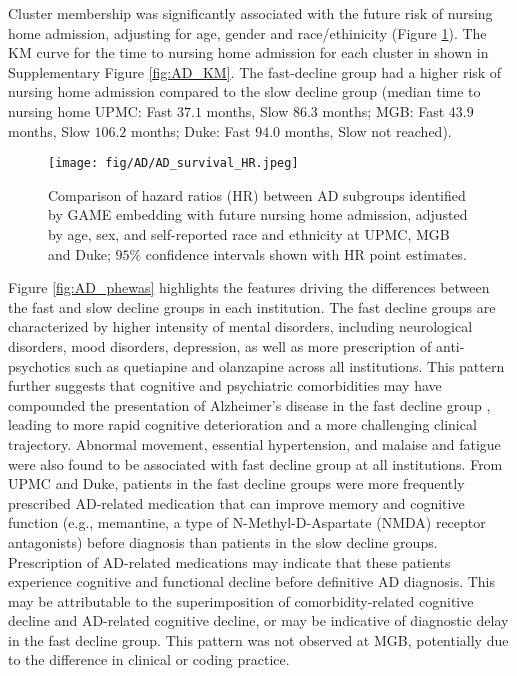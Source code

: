 \documentclass{article}
\begin{document}
Cluster membership was significantly associated with the future risk of nursing home admission, adjusting for age, gender and race/ethinicity (Figure \ref{fig:AD_HR}). The KM curve for the time to nursing home admission for each cluster in shown in Supplementary Figure \ref{fig:AD_KM}. The fast-decline group had a higher risk of nursing home admission compared to the slow decline group (median time to nursing home UPMC: Fast $37.1$ months, Slow $86.3$ months; MGB: Fast $43.9$ months, Slow $106.2$ months; Duke: Fast $94.0$ months, Slow not reached). 


\begin{figure}[htpb!]
    \centering
    \texttt{[image: fig/AD/AD\_survival\_HR.jpeg]}
    \caption{Comparison of hazard ratios (HR) between AD subgroups identified by GAME embedding with future nursing home admission, adjusted by age, sex, and self-reported race and ethnicity at UPMC, MGB and Duke; $95\%$ confidence intervals shown with HR point estimates.}
    \label{fig:AD_HR}
\end{figure}


Figure \ref{fig:AD_phewas} highlights the features driving the differences between the fast and slow decline groups in each institution.  The fast decline groups are characterized by higher intensity of mental disorders, including neurological disorders, mood disorders, depression, as well as more prescription of anti-psychotics such as quetiapine and olanzapine \cite{cipriani2011comparative, arvanitis1997multiple} across all institutions. This pattern further suggests that cognitive and psychiatric comorbidities may have compounded the presentation of Alzheimer's disease in the fast decline group \cite{ismail2022psychosis}, leading to more rapid cognitive deterioration and a more challenging clinical trajectory. Abnormal movement, essential hypertension, and malaise and fatigue were also found to be associated with fast decline group at all institutions. From UPMC and Duke, patients in the fast decline groups were more frequently prescribed AD-related medication that can improve memory and cognitive function (e.g., memantine, a type of N-Methyl-D-Aspartate (NMDA) receptor antagonists) \cite{liu2019role, tariot2004memantine} before diagnosis than patients in the slow decline groups. Prescription of AD-related medications may indicate that these patients experience cognitive and functional decline before definitive AD diagnosis. This may be attributable to the superimposition of comorbidity-related cognitive decline and AD-related cognitive decline, or may be indicative of diagnostic delay in the fast decline group. This pattern was not observed at MGB, potentially due to the difference in clinical or coding practice.
\end{document}
